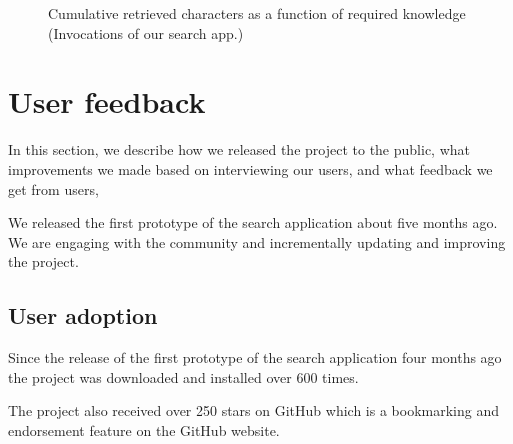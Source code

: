 \begin{figure}[h!]
\centering
{}
\caption{Cumulative retrieved characters as a function of required knowledge (Invocations of our search app.)}
\label{eval-metrics-plot-chars-resh}
\end{figure}


\clearpage
\section{User feedback}

In this section, we describe how we released the project to the public, what improvements we made based on interviewing our users, and what feedback we get from users,

We released the first prototype of the search application about five months ago. We are engaging with the community and incrementally updating and improving the project. 

\subsection{User adoption}

Since the release of the first prototype of the search application four months ago the project was downloaded and installed over 600 times. 

The project also received over 250 stars on GitHub which is a bookmarking and endorsement feature on the GitHub website.\cite{github-stars}



